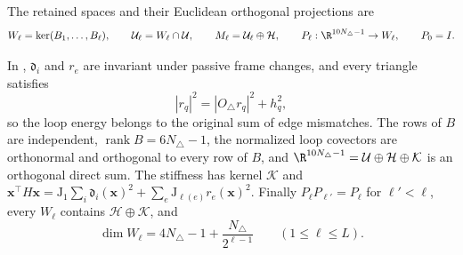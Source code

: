 The retained spaces and their Euclidean orthogonal projections are
\begin{equation}
W_\ell=\ker(B_1,\ldots,B_\ell),\qquad
\mathcal U_\ell=W_\ell\cap\mathcal U,\qquad
M_\ell=\mathcal U_\ell\oplus\mathcal H,\qquad
P_\ell:\R^{10N_\triangle-1}\to W_\ell,\qquad P_0=I.
\label{eq:rg-formation-projections}
\end{equation}

In , \(\mathfrak d_i\) and \(r_e\) are
invariant under passive frame changes, and every triangle satisfies
\begin{equation}
|r_q|^2=|O_\triangle r_q|^2+h_q^2,
\label{eq:rg-formation-loop-decomposition}
\end{equation}
so the loop energy belongs to the original sum of edge mismatches. The rows of
\(B\) are independent, \(\operatorname{rank}B=6N_\triangle-1\), the normalized
loop covectors are orthonormal and orthogonal to every row of \(B\), and
\(\R^{10N_\triangle-1}=\mathcal U\oplus\mathcal H\oplus\mathcal K\) is an
orthogonal direct sum. The stiffness has kernel \(\mathcal K\) and
\(\mathbf x^\top H\mathbf x=\mathrm J_1\sum_i\mathfrak d_i(\mathbf x)^2
+\sum_e\mathrm J_{\ell(e)}r_e(\mathbf x)^2\). Finally
\(P_\ell P_{\ell'}=P_\ell\) for \(\ell'<\ell\), every \(W_\ell\) contains
\(\mathcal H\oplus\mathcal K\), and
\begin{equation}
\dim W_\ell=4N_\triangle-1+\frac{N_\triangle}{2^{\ell-1}}\qquad(1\le\ell\le L).
\label{eq:rg-formation-dimensions}
\end{equation}

